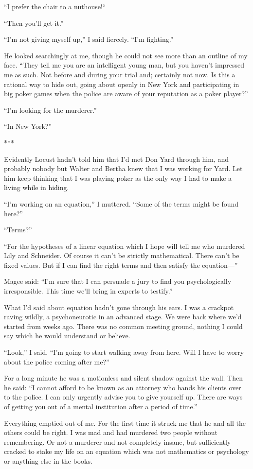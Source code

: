 \documentclass{novel}
\begin{document}
{“I prefer the chair to a nuthouse!“

“Then you’ll get it.”

“I’m not giving myself up,” I said fiercely. “I’m fighting.”

He looked searchingly at me, though he could not see more than an outline of my face. “They tell me you are an intelligent young man, but you haven’t impressed me as such. Not before and during your trial and; certainly not now. Is this a rational way to hide out, going about openly in New York and participating in big poker games when the police are aware of your reputation as a poker player?”

“I’m looking for the murderer.”

“In New York?”

***

Evidently Locust hadn’t told him that I’d met Don Yard through him, and probably nobody but Walter and Bertha knew that I was working for Yard. Let him keep thinking that I was playing poker as the only way I had to make a living while in hiding.

“I’m working on an equation,” I muttered. “Some of the terms might be found here?”

“Terms?”

“For the hypotheses of a linear equation which I hope will tell me who murdered Lily and Schneider. Of course it can’t be strictly mathematical. There can’t be fixed values. But if I can find the right terms and then satisfy the equation—”

Magee said: “I’m sure that I can persuade a jury to find you psychologically irresponsible. This time we’ll bring in experts to testify.”

What I’d said about equation hadn’t gone through his ears. I was a crackpot raving wildly, a psychoneurotic in an advanced stage. We were back where we’d started from weeks ago. There was no common meeting ground, nothing I could say which he would understand or believe.

“Look,” I said. “I’m going to start walking away from here. Will I have to worry about the police coming after me?”

For a long minute he was a motionless and silent shadow against the wall. Then he said: “I cannot afford to be known as an attorney who hands his clients over to the police. I can only urgently advise you to give yourself up. There are ways of getting you out of a mental institution after a period of time.”

Everything emptied out of me. For the first time it struck me that he and all the others could be right. I was mad and had murdered two people without remembering. Or not a murderer and not completely insane, but sufficiently cracked to stake my life on an equation which was not mathematics or psychology or anything else in the books.

}
\end{document}
